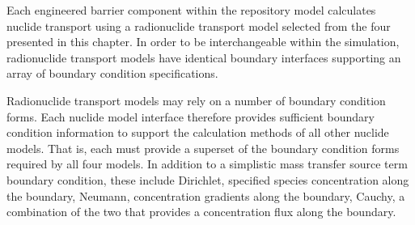 Each engineered barrier component within the \Cyder repository model calculates 
nuclide transport using a radionuclide transport model selected from the four presented in this 
chapter. In order to be interchangeable within the simulation, radionuclide 
transport models have identical boundary interfaces supporting an array of 
boundary condition specifications. 

Radionuclide transport models may rely on a number of boundary condition forms.  
Each nuclide model interface therefore provides sufficient boundary condition 
information to support the calculation methods of all other nuclide models. That 
is, each must provide a superset of the boundary condition forms required by all 
four models. In addition to a simplistic mass transfer source term boundary 
condition, these include Dirichlet, specified species concentration along the 
boundary, Neumann, concentration gradients along the boundary, Cauchy, a 
combination of the two that provides a concentration flux along the boundary.
